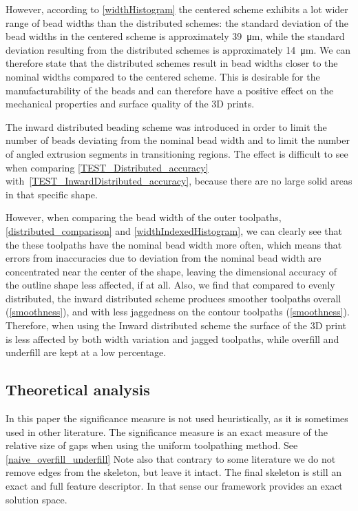 However, according to \cref{widthHistogram} the centered scheme exhibits a lot wider range of bead widths than the distributed schemes:
the standard deviation of the bead widths in the centered scheme is approximately \SI{39}{\micro\meter}, while the standard deviation resulting from the distributed schemes is approximately \SI{14}{\micro\meter}.
We can therefore state that the distributed schemes result in bead widths closer to the nominal widths compared to the centered scheme.
This is desirable for the manufacturability of the beads and can therefore have a positive effect on the mechanical properties and surface quality of the 3D prints. 

The inward distributed beading scheme was introduced in order to limit the number of beads deviating from the nominal bead width and to limit the number of angled extrusion segments in transitioning regions.
The effect is difficult to see when comparing \cref{TEST_Distributed_accuracy} with~\ref{TEST_InwardDistributed_accuracy}, because there are no large solid areas in that specific shape.

However, when comparing the bead width of the outer toolpaths, \cref{distributed_comparison} and  \cref{widthIndexedHistogram}, we can clearly see that the these toolpaths have the nominal bead width more often, which means that errors from inaccuracies due to deviation from the nominal bead width are concentrated near the center of the shape, leaving the dimensional accuracy of the outline shape less affected, if at all. 
Also, we find that compared to evenly distributed, the inward distributed scheme produces smoother toolpaths overall (\cref{smoothness}), and with less jaggedness on the contour toolpaths (\cref{smoothness}). 
Therefore, when using the Inward distributed scheme the surface of the 3D print is less affected by both width variation and jagged toolpaths, while overfill and underfill are kept at a low percentage.


\subsection{Theoretical analysis}
In this paper the significance measure is not used heuristically, as it is sometimes used in other literature.
The significance measure is an exact measure of the relative size of gaps when using the uniform toolpathing method.
See \cref{naive_overfill_underfill}
Note also that contrary to some literature we do not remove edges from the skeleton, but leave it intact.
The final skeleton is still an exact and full feature descriptor.
In that sense our framework provides an exact solution space.

